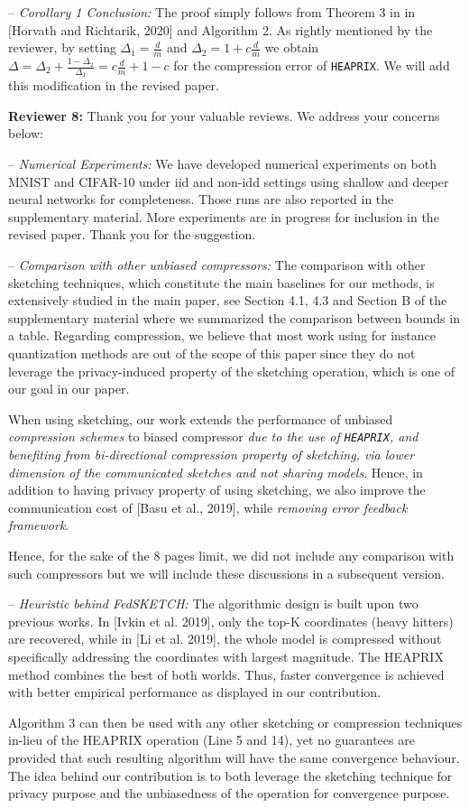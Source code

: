 \documentclass{article}
\begin{document}
-- \textit{Corollary 1 Conclusion:} 
The proof simply follows from Theorem 3 in in [Horvath and Richtarik, 2020] and Algorithm 2.
As rightly mentioned by the reviewer, by setting $\Delta_1=\frac{d}{m}$ and $\Delta_2=1+c\frac{d}{m}$ we obtain $\Delta=\Delta_2+\frac{1-\Delta_2}{\Delta_1}=c\frac{d}{m} + 1 - c$ for the compression error of \texttt{HEAPRIX}. We will add this modification in the revised paper. 

\textbf{Reviewer 8:} Thank you for your valuable reviews. We address your concerns below:

-- \textit{Numerical Experiments:} We have developed numerical experiments on both MNIST and CIFAR-10 under iid and non-idd settings using shallow and deeper neural networks for completeness. 
Those runs are also reported in the supplementary material.
More experiments are in progress for inclusion in the revised paper. 
Thank you for the suggestion.

-- \textit{Comparison with other unbiased compressors:} 
The comparison with other sketching techniques, which constitute the main baselines for our methods, is extensively studied in the main paper, see Section 4.1, 4.3 and Section B of the supplementary material where we summarized the comparison between bounds in a table.
Regarding compression, we believe that most work using for instance quantization methods are out of the scope of this paper since they do not leverage the privacy-induced property of the sketching operation, which is one of our goal in our paper.

When using sketching, our work extends the performance of unbiased \emph{compression schemes} to biased compressor \emph{due to the use of \texttt{HEAPRIX}, and benefiting from bi-directional compression property of sketching, via lower dimension of the communicated sketches and not sharing models}.  
Hence, in addition to having privacy property of using sketching, we also improve the communication cost of [Basu et al., 2019], while \emph{removing error feedback framework}.   

Hence, for the sake of the 8 pages limit, we did not include any comparison with such compressors but we will include these discussions in a subsequent version. 

-- \textit{Heuristic behind FedSKETCH:} 
The algorithmic design is built upon two previous works. 
In [Ivkin et al. 2019], only the top-K coordinates (heavy hitters) are recovered, while in [Li et al. 2019], the whole model is compressed without specifically addressing the coordinates with largest magnitude. 
The HEAPRIX method combines the best of both worlds. 
Thus, faster convergence is achieved with better empirical performance as displayed in our contribution.

Algorithm 3 can then be used with any other sketching or compression techniques in-lieu of the HEAPRIX operation (Line 5 and 14), yet no guarantees are provided that such resulting algorithm will have the same convergence behaviour.
The idea behind our contribution is to both leverage the sketching technique for privacy purpose and the unbiasedness of the operation for convergence purpose.
\end{document}
